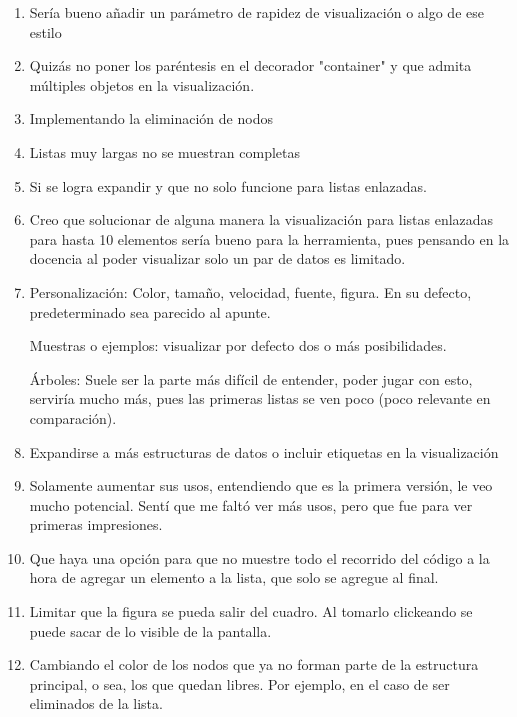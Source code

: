 \begin{enumerate}
    \item Sería bueno añadir un parámetro de rapidez de visualización o algo de ese estilo
    \item Quizás no poner los paréntesis en el decorador "container" y que admita múltiples objetos en la visualización.
    \item Implementando la eliminación de nodos
    \item Listas muy largas no se muestran completas
    \item Si se logra expandir y que no solo funcione para listas enlazadas.
    \item Creo que solucionar de alguna manera la visualización para listas enlazadas para hasta 10 elementos sería bueno para la herramienta, pues pensando en la docencia al poder visualizar solo un par de datos es limitado.
    \item Personalización: Color, tamaño, velocidad, fuente, figura. En su defecto, predeterminado sea parecido al apunte.

          Muestras o ejemplos: visualizar por defecto dos o más posibilidades.

          Árboles: Suele ser la parte más difícil de entender, poder jugar con esto, serviría mucho más, pues las primeras listas se ven poco (poco relevante en comparación).

    \item Expandirse a más estructuras de datos o incluir etiquetas en la visualización
    \item Solamente aumentar sus usos, entendiendo que es la primera versión, le veo mucho potencial. Sentí que me faltó ver más usos, pero que fue para ver primeras impresiones.
    \item Que haya una opción para que no muestre todo el recorrido del código a la hora de agregar un elemento a la lista, que solo se agregue al final.
    \item Limitar que la figura se pueda salir del cuadro. Al tomarlo clickeando se puede sacar de lo visible de la pantalla.
    \item Cambiando el color de los nodos que ya no forman parte de la estructura principal, o sea, los que quedan libres. Por ejemplo, en el caso de ser eliminados de la lista.
\end{enumerate}